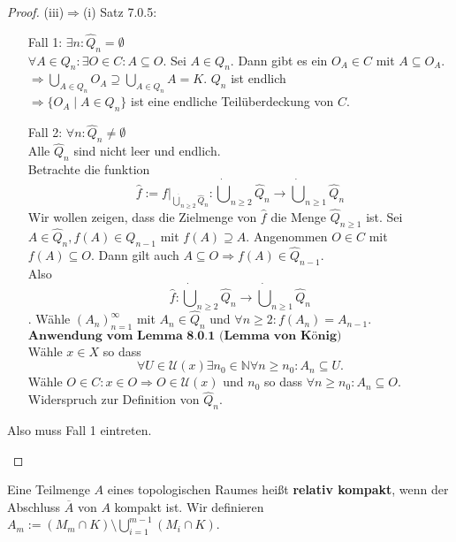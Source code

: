 \begin{proof}{(iii)$\Rightarrow$(i) Satz 7.0.5:}
\begin{itemize}
\begin{itemize}
    \item[Fall 1:] $\exists n: \hat{Q}_n = \emptyset$\\
    $\forall A \in Q_n: \exists O \in C: A \subseteq O$.
    Sei $A \in Q_n$. Dann gibt es ein $O_A \in C$ mit $A \subseteq O_A$.
    $\Rightarrow \bigcup_{A \in Q_n} O_A \supseteq \bigcup_{A \in Q_n} A = K$.
    $Q_n$ ist endlich\\
    $\Rightarrow \{O_A \mid A \in Q_n\}$ ist eine endliche Teilüberdeckung von $C$.
    \item[Fall 2:] $\forall n: \hat{Q}_n \neq \emptyset$\\
    Alle $\hat{Q}_n$ sind nicht leer und endlich.\\
    Betrachte die funktion 
    $$
    \hat{f}:= f\vert_{\dot{\bigcup}_{n\geq 2}\hat{Q}_n} : 
    \dot{\bigcup}_{n\geq 2}\hat{Q}_n \to \dot{\bigcup}_{n \geq 1}\hat{Q}_n
    $$
    Wir wollen zeigen, dass die Zielmenge von $\hat{f}$
    die Menge  $\hat{Q}_{n\geq 1}$ ist.
    Sei $A \in \hat{Q}_n, f(A) \in Q_{n-1}$ mit $f(A) \supseteq A$.
    Angenommen $O \in C$ mit $f(A) \subseteq O$.
    Dann gilt auch $A \subseteq O \Rightarrow f(A) \in \hat{Q}_{n-1}$.\\
    Also 
    $$
    \hat{f}:
    \dot{\bigcup}_{n\geq 2}\hat{Q}_n \to \dot{\bigcup}_{n \geq 1}\hat{Q}_n
    $$.
    Wähle $(A_n)_{n=1}^{\infty}$ mit $A_n \in \hat{Q}_n$ und 
    $\forall n \geq 2: f(A_n) = A_{n-1}$.\\
    $\boxed{\textbf{Anwendung vom Lemma 8.0.1 (Lemma von König)}}$\\
    Wähle $x \in X$ so dass
    $$
    \forall U \in \mathcal{U}(x) \exists n_0 \in \mathbb{N} \forall n \geq n_0: A_n \subseteq U.
    $$
    Wähle $O\in C: x \in O \Rightarrow O \in \mathcal{U}(x)$ 
    und $n_0$ so dass $\forall n \geq n_0: A_n \subseteq O$.\\
    Widerspruch zur Definition von $\hat{Q}_n$.\\
\end{itemize}
    Also muss Fall 1 eintreten.

\end{itemize}

\end{proof}

{
    Eine Teilmenge $A$ eines topologischen Raumes heißt \textbf{relativ kompakt},
    wenn der Abschluss $\overline{A}$ von $A$ kompakt ist.
    Wir definieren $A_m := (M_m \cap K) \setminus \bigcup_{i=1}^{m-1} (M_i \cap K)$.
}

